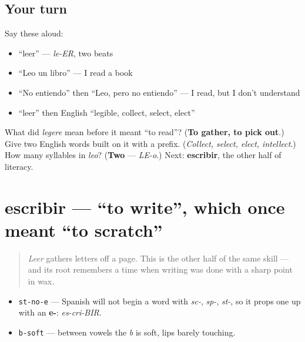 \subsection*{Your turn}
Say these aloud:

\begin{itemize}
\raggedright
  \item \textquotedblleft{}leer\textquotedblright{} — \emph{le-ER}, two beats
  \item \textquotedblleft{}Leo un libro\textquotedblright{} — I read a book
  \item \textquotedblleft{}No entiendo\textquotedblright{} then \textquotedblleft{}Leo, pero no entiendo\textquotedblright{} — I read, but I don't understand
  \item \textquotedblleft{}leer\textquotedblright{} then English \textquotedblleft{}legible, collect, select, elect\textquotedblright{}
\end{itemize}

\begin{tcolorbox}[breakable,colback=teal!4,colframe=teal!35!black,title={Before you move on}]
What did \emph{legere} mean before it meant \textquotedblleft{}to read\textquotedblright{}? (\textbf{To gather, to pick out}.) Give two English words built on it with a prefix. (\emph{Collect, select, elect, intellect}.) How many syllables in \emph{leo}? (\textbf{Two} — \emph{LE-o}.) Next: \textbf{escribir}, the other half of literacy.
\end{tcolorbox}
\section[escribir]{escribir — \textquotedblleft{}to write\textquotedblright{}, which once meant \textquotedblleft{}to scratch\textquotedblright{}}

\label{lesson:ES-C34-escribir}



\begin{quote}
\emph{Leer} gathers letters off a page. This is the other half of the same skill — and its root remembers a time when writing was done with a sharp point in wax.
\end{quote}

\begin{sounds}
\begin{itemize}
\raggedright
  \item \texttt{st-no-e} — Spanish will not begin a word with \emph{sc-}, \emph{sp-}, \emph{st-}, so it props one up with an \textbf{e-}: \emph{es-cri-BIR}.
  \item \texttt{b-soft} — between vowels the \emph{b} is soft, lips barely touching.
\end{itemize}
\end{sounds}

